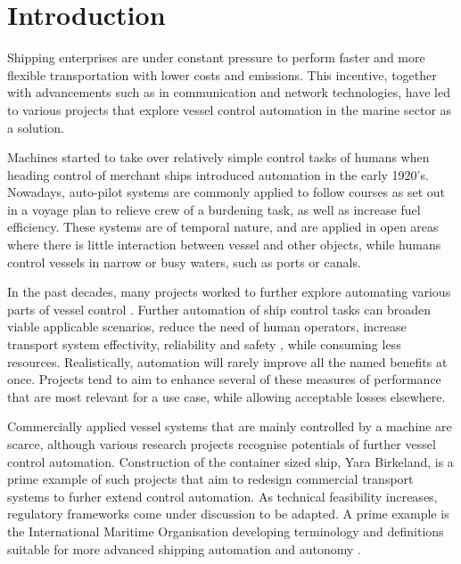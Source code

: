 \chapter{Introduction}



Shipping enterprises are under constant pressure to perform faster and more flexible transportation with lower costs and emissions.  This incentive, together with advancements such as in communication and network technologies, have led to various projects that explore vessel control automation in the marine sector as a solution. 

Machines started to take over relatively simple control tasks of humans when heading control of merchant ships introduced automation in the early 1920's. Nowadays, auto-pilot systems are commonly applied to follow courses as set out in a voyage plan to relieve crew of a burdening task, as well as increase fuel efficiency. These systems are of temporal nature, and are applied in open areas where there is little interaction between vessel and other objects, while humans control vessels in narrow or busy waters, such as ports or canals.

In the past decades, many projects worked to further explore automating various parts of vessel control \cite{nzengu2021regulatory}. Further automation of ship control tasks can broaden viable applicable scenarios, reduce the need of human operators, increase transport system effectivity, reliability and safety \cite{de2021impact}, while consuming less resources. Realistically, automation will rarely improve all the named benefits at once. Projects tend to aim to enhance several of these measures of performance that are most relevant for a use case, while allowing acceptable losses elsewhere. 

Commercially applied vessel systems that are mainly controlled by a machine are scarce, although various research projects recognise potentials of further vessel control automation. Construction of the container sized ship, Yara Birkeland, \cite{yaraBirkelandWebNov2020} is a prime example of such projects that aim to redesign commercial transport systems to furher extend control automation. As technical feasibility increases, regulatory frameworks come under discussion to be adapted. A prime example is the International Maritime Organisation developing terminology and definitions suitable for more advanced shipping automation and autonomy \cite{IMO103ISORegulatoryScopingExMass}.

